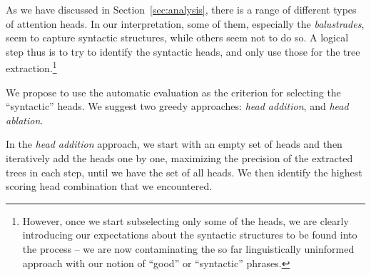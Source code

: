 \documentclass[11pt,a4paper]{article}
\newcommand\ie{i.e.\ }
\def\RR#1{{\color{blue}RR: \it #1}}
\def\DEL#1{{\color{green}SMAZAT: \it #1}}
\def\RR#1{}
\def\DEL#1{}
\begin{document}
As we have discussed in Section~\ref{sec:analysis}, there is a range of different types of attention heads.
In our interpretation, some of them, especially the \emph{balustrades}, seem to capture syntactic structures, while others seem not to do so.
A logical step thus is to try to identify the syntactic heads, and only use those for the tree extraction.\footnote{
However, once we start subselecting only some of the heads, we are clearly introducing our expectations about the syntactic structures to be found into the process -- we are now contaminating the so far linguistically uninformed approach with our notion of ``good'' or ``syntactic'' phrases.
}
\DEL{However, there is a big threat hidden in this step.
When using all of the attention heads in the parsing, we truly evaluate what is captured by the heads, without imposing any strong assumptions about the syntax that we want to find in the attentions.
But once we start subselecting only some of the heads, we are clearly introducing our expectations about the syntactic structures to be found into the process -- we are now contaminating the so far linguistically uninformed approach with our notion of ``good'' or ``syntactic'' phrases.
%
This may be wishful thinking, \ie we might be trying so hard to get syntactic trees from the self-attentions as to find stuff that is not really there. There are 96 heads, so it is likely that there is a way of subselecting some of them to increase the parsing accuracy, but we should be careful with the interpretation.
%
2 ways: supervised (evaluate against standard trees), heuristic (define a balustradeness measure and select the most balustrady heads)
%
\subsection{Supervised}
}

We propose to use the automatic evaluation \DEL{of our parse trees against the standard parse trees} as the criterion for selecting the ``syntactic'' heads. We suggest two greedy approaches: \emph{head addition}, and \emph{head ablation}.

In the \emph{head addition} approach, we start with an empty set of heads and then iteratively add the heads one by one, maximizing the precision of the extracted trees in each step, until we have the set of all heads. We then identify the highest scoring head combination that we encountered.
\end{document}
